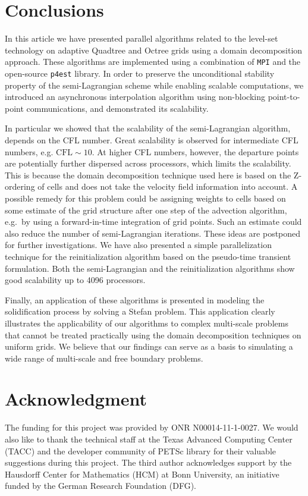 \section{Conclusions}
In this article we have presented parallel algorithms related to the level-set technology on adaptive Quadtree and Octree grids using a domain decomposition approach. These algorithms are implemented using a combination of \texttt{MPI} and the open-source \texttt{p4est} library. In order to preserve the unconditional stability property of the semi-Lagrangian scheme while enabling scalable computations, we introduced an asynchronous interpolation algorithm using non-blocking point-to-point communications, and demonstrated its scalability. 

In particular we showed that the scalability of the semi-Lagrangian algorithm, depends on the CFL number. Great scalability is observed for intermediate CFL numbers, e.g. $\text{CFL}\sim10$. At higher CFL numbers, however, the departure points are potentially further dispersed across processors, which limits the scalability. This is because the domain decomposition technique used here is based on the Z-ordering of cells and does not take the velocity field information into account. A possible remedy for this problem could be assigning weights to cells based on some estimate of the grid structure after one step of the advection algorithm, e.g.\ by using a forward-in-time integration of grid points. Such an estimate could also reduce the number of semi-Lagrangian iterations. These ideas are postponed for further investigations. We have also presented a simple parallelization technique for the reinitialization algorithm based on the pseudo-time transient formulation. Both the semi-Lagrangian and the reinitialization algorithms show good scalability up to 4096 processors. 

Finally, an application of these algorithms is presented in modeling the solidification process by solving a Stefan problem. This application clearly illustrates the applicability of our algorithms to complex multi-scale problems that cannot be treated practically using the domain decomposition techniques on uniform grids. We believe that our findings can serve as a basis to simulating a wide range of multi-scale and free boundary problems.

\section*{Acknowledgment} 
The funding for this project was provided by ONR N00014-11-1-0027.
We would also like to thank the technical staff at the Texas Advanced Computing
Center (TACC) and the developer community of PETSc library for their valuable
suggestions during this project.
The third author acknowledges support by the Hausdorff Center for Mathematics
(HCM) at Bonn University,
an initiative funded by the German Research Foundation (DFG).
